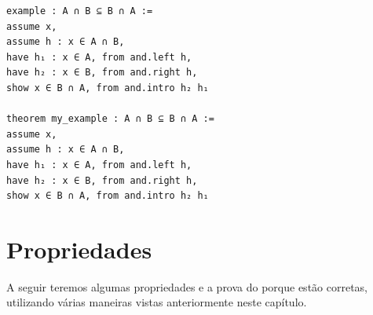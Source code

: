 \begin{lstlisting}
example : A ∩ B ⊆ B ∩ A :=
assume x,
assume h : x ∈ A ∩ B,
have h₁ : x ∈ A, from and.left h,
have h₂ : x ∈ B, from and.right h,
show x ∈ B ∩ A, from and.intro h₂ h₁

theorem my_example : A ∩ B ⊆ B ∩ A :=
assume x,
assume h : x ∈ A ∩ B,
have h₁ : x ∈ A, from and.left h,
have h₂ : x ∈ B, from and.right h,
show x ∈ B ∩ A, from and.intro h₂ h₁ \end{lstlisting}

\section{Propriedades}
A seguir teremos algumas propriedades e a prova do porque estão corretas, utilizando várias maneiras vistas anteriormente neste capítulo.

